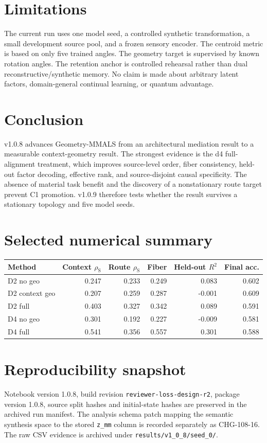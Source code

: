 \documentclass[10pt]{article}
\newcommand{\rhoS}{\rho_{\mathrm{S}}}
\begin{document}
\section{Limitations}
The current run uses one model seed, a controlled synthetic transformation, a small development source pool, and a frozen sensory encoder. The centroid metric is based on only five trained angles. The geometry target is supervised by known rotation angles. The retention anchor is controlled rehearsal rather than dual reconstructive/synthetic memory. No claim is made about arbitrary latent factors, domain-general continual learning, or quantum advantage.

\section{Conclusion}
v1.0.8 advances Geometry-MMALS from an architectural mediation result to a measurable context-geometry result. The strongest evidence is the d4 full-alignment treatment, which improves source-level order, fiber consistency, held-out factor decoding, effective rank, and source-disjoint causal specificity. The absence of material task benefit and the discovery of a nonstationary route target prevent C1 promotion. v1.0.9 therefore tests whether the result survives a stationary topology and five model seeds.

\appendix
\section{Selected numerical summary}
\begin{center}
\small
\begin{tabular}{@{}lrrrrr@{}}
\toprule
Method & Context $\rhoS$ & Route $\rhoS$ & Fiber & Held-out $R^2$ & Final acc. \\
\midrule
D2 no geo & 0.247 & 0.233 & 0.249 & 0.083 & 0.602 \\
D2 context geo & 0.207 & 0.259 & 0.287 & -0.001 & 0.609 \\
D2 full & 0.403 & 0.327 & 0.342 & 0.089 & 0.591 \\
D4 no geo & 0.301 & 0.192 & 0.227 & -0.009 & 0.581 \\
D4 full & 0.541 & 0.356 & 0.557 & 0.301 & 0.588 \\
\bottomrule
\end{tabular}
\end{center}

\section{Reproducibility snapshot}
Notebook version 1.0.8, build revision \texttt{reviewer-loss-design-r2}, package version 1.0.8, source split hashes and initial-state hashes are preserved in the archived run manifest. The analysis schema patch mapping the semantic synthesis space to the stored \texttt{z\_mm} column is recorded separately as CHG-108-16. The raw CSV evidence is archived under \texttt{results/v1\_0\_8/seed\_0/}.
\end{document}
